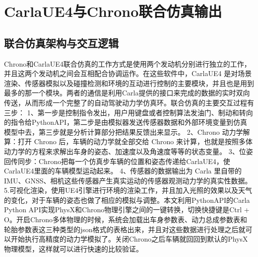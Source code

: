 \section{CarlaUE4与Chrono联合仿真输出}

\subsection{联合仿真架构与交互逻辑}
Chrono和CarlaUE4联合仿真的工作方式是使用两个发动机分别进行独立的工作，并且这两个发动机之间会互相配合协调运作。在这些软件中，CarlaUE4 是对场景渲染、传感器模拟以及碰撞检测和环境的互动进行控制的主要模块，并且也是用到最多的那一个模块。两者的通信是利用Carla提供的接口来完成的数据的实时双向传送，从而形成一个完整了的自动驾驶动力学仿真环。联合仿真的主要交互过程有三步：
1、第一步是控制指令发出，用户用键盘或者控制算法发油门、制动和转向的指令给PythonAPI，第二步是由模拟器发送传感器数据和外部环境变量到仿真模型中去，第三步就是分析计算部分把结果反馈出来显示。
2、Chrono 动力学解算：打开 Chrono 后，车辆的动力学就全部交给 Chrono 来计算，也就是按照多体动力学的方程来求解出车身的姿态、加速度以及角速度等等的状态变量。
3、位姿回传同步：Chrono把每一个仿真步车辆的位置和姿态传递给CarlaUE4，使CarlaUE4里面的车辆模型运动起来。
4、传感器的数据输出为 Carla 里自带的 IMU、GNSS、相机这些传感器产生真实运动的传感器观测动力学的真实性数据。
5.可视化渲染，使用UE4引擎进行环境的渲染工作，并且加入光照的效果以及天气的变化，对于车辆的姿态也做了相应的模拟与调整。本文利用PythonAPI的Carla Python API实现PhysX和Chrono物理引擎之间的一键转换，切换快捷键是Ctrl + O。开启Chrono多体物理的时候，系统会加载出车身参数表、动力总成参数表和轮胎参数表这三种类型的json格式的表格出来，并且对这些数据进行处理之后就可以开始执行高精度的动力学模拟了。关闭Chrono之后车辆就回回到默认的PhysX物理模型，这样就可以进行快速的比较验证。

